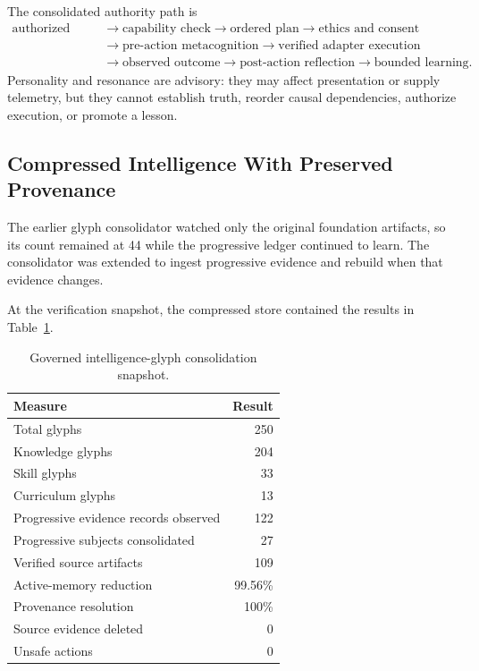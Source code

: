 The consolidated authority path is
\begin{equation}
\begin{aligned}
\text{authorized goal}
&\rightarrow \text{capability check}
\rightarrow \text{ordered plan}
\rightarrow \text{ethics and consent} \\
&\rightarrow \text{pre-action metacognition}
\rightarrow \text{verified adapter execution} \\
&\rightarrow \text{observed outcome}
\rightarrow \text{post-action reflection}
\rightarrow \text{bounded learning}.
\end{aligned}
\label{eq:aion-governed-cognition-path}
\end{equation}
Personality and resonance are advisory: they may affect presentation or supply
telemetry, but they cannot establish truth, reorder causal dependencies,
authorize execution, or promote a lesson.

\subsection{Compressed Intelligence With Preserved Provenance}
\label{subsec:aion-progressive-glyphs}

The earlier glyph consolidator watched only the original foundation artifacts,
so its count remained at 44 while the progressive ledger continued to learn.
The consolidator was extended to ingest progressive evidence and rebuild when
that evidence changes.

At the verification snapshot, the compressed store contained the results in
Table~\ref{tab:aion-glyph-consolidation}.

\begin{table}[htbp]
\centering
\caption{Governed intelligence-glyph consolidation snapshot.}
\label{tab:aion-glyph-consolidation}
\begin{tabular}{@{}lr@{}}
\toprule
Measure & Result \\
\midrule
Total glyphs & 250 \\
Knowledge glyphs & 204 \\
Skill glyphs & 33 \\
Curriculum glyphs & 13 \\
Progressive evidence records observed & 122 \\
Progressive subjects consolidated & 27 \\
Verified source artifacts & 109 \\
Active-memory reduction & 99.56\% \\
Provenance resolution & 100\% \\
Source evidence deleted & 0 \\
Unsafe actions & 0 \\
\bottomrule
\end{tabular}
\end{table}

